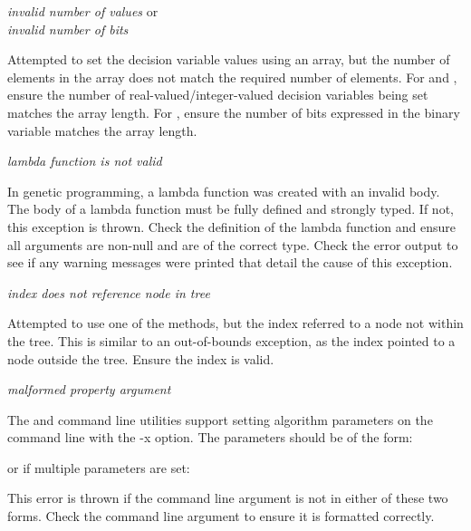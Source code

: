 \noindent
\textit{invalid number of values} or\\
\textit{invalid number of bits}
\begin{indented}
  Attempted to set the decision variable values using an array, but the number of elements in the array does not match the required number of elements. For  and , ensure the number of real-valued/integer-valued decision variables being set matches the array length.  For , ensure the number of bits expressed in the binary variable matches the array length.
\end{indented}

\noindent
\textit{lambda function is not valid}
\begin{indented}
  In genetic programming, a lambda function was created with an invalid body. The body of a lambda function must be fully defined and strongly typed.  If not, this exception is thrown.  Check the definition of the lambda function and ensure all arguments are non-null and are of the correct type.  Check the error output to see if any warning messages were printed that detail the cause of this exception.
\end{indented}

\noindent
\textit{index does not reference node in tree}
\begin{indented}
  Attempted to use one of the  methods, but the index referred to a node not within the tree.  This is similar to an out-of-bounds exception, as the index pointed to a node outside the tree.  Ensure the index is valid.
\end{indented}

\noindent
\textit{malformed property argument}
\begin{indented}
  The  and  command line utilities support setting algorithm parameters on the command line with the -x option.  The parameters should be of the form:
  \begin{indented}
  \end{indented}
  or if multiple parameters are set:
  \begin{indented}
  \end{indented}
  This error is thrown if the command line argument is not in either of these two forms.  Check the command line argument to ensure it is formatted correctly.
\end{indented}

